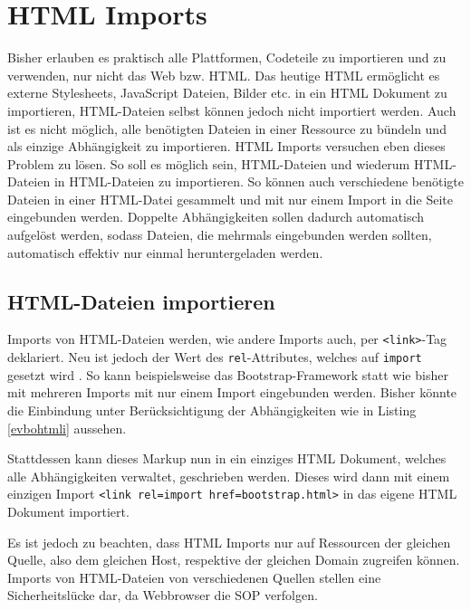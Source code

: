 \section{HTML Imports}\label{html-imports}

Bisher erlauben es praktisch alle Plattformen, Codeteile zu importieren und zu verwenden, nur nicht das Web bzw. \ac{HTML}. Das heutige \ac{HTML} ermöglicht es externe Stylesheets, JavaScript Dateien, Bilder etc. in ein \ac{HTML} Dokument zu importieren, \ac{HTML}-Dateien selbst können jedoch nicht importiert werden. Auch ist es nicht möglich, alle benötigten Dateien in einer Ressource zu bündeln und als einzige Abhängigkeit zu importieren. \ac{HTML} Imports versuchen eben dieses Problem zu lösen. So soll es möglich sein, \ac{HTML}-Dateien und wiederum \ac{HTML}-Dateien in \ac{HTML}-Dateien zu importieren. So können auch verschiedene benötigte Dateien in einer \ac{HTML}-Datei gesammelt und mit nur einem Import in die Seite eingebunden werden. Doppelte Abhängigkeiten sollen dadurch automatisch aufgelöst werden, sodass Dateien, die mehrmals eingebunden werden sollten, automatisch effektiv nur einmal heruntergeladen werden.


\subsection{HTML-Dateien importieren}\label{html-dateien-importieren}

Imports von \ac{HTML}-Dateien werden, wie andere Imports auch, per \texttt{\textless{}link\textgreater{}}-Tag deklariert. Neu ist jedoch der Wert des \texttt{rel}-Attributes, welches auf \texttt{import} gesetzt wird \cite[S. 139-147]{citeulike:13844975}. So kann beispielsweise das Bootstrap-Frame\-work statt wie bisher mit mehreren Imports mit nur einem Import eingebunden werden. Bisher könnte die Einbindung unter Berücksichtigung der Abhängigkeiten wie in Listing \ref{evbohtmli} aussehen.



Stattdessen kann dieses Markup nun in ein einziges \ac{HTML} Dokument, welches alle Abhängigkeiten verwaltet, geschrieben werden. Dieses wird dann mit einem einzigen Import \texttt{\textless{}link\ rel=\dq import\dq\ href=\dq bootstrap.html\dq\textgreater{}} in das eigene \ac{HTML} Dokument importiert.

Es ist jedoch zu beachten, dass \ac{HTML} Imports nur auf Ressourcen der gleichen Quelle, also dem gleichen Host, respektive der gleichen Domain zugreifen können. Imports von \ac{HTML}-Dateien von verschiedenen Quellen stellen eine Sicherheitslücke dar, da Webbrowser die \ac{SOP} verfolgen.

